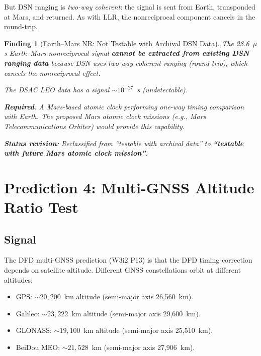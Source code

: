 \documentclass[11pt]{article}
\newtheorem{finding}{Finding}
\begin{document}
But DSN ranging is \emph{two-way coherent}: the signal is sent from
Earth, transponded at Mars, and returned. As with LLR, the nonreciprocal
component cancels in the round-trip.

\begin{finding}[Earth--Mars NR: Not Testable with Archival DSN Data]
\label{find:Mars-not-archival}
The 28.6~$\mu$s Earth--Mars nonreciprocal signal \textbf{cannot be
extracted from existing DSN ranging data} because DSN uses two-way
coherent ranging (round-trip), which cancels the nonreciprocal effect.

The DSAC LEO data has a signal $\sim 10^{-27}$~s (undetectable).

\textbf{Required}: A Mars-based atomic clock performing one-way timing
comparison with Earth. The proposed Mars atomic clock missions (e.g.,
Mars Telecommunications Orbiter) would provide this capability.

\textbf{Status revision}: Reclassified from ``testable with archival data''
to \textbf{``testable with future Mars atomic clock mission''}.
\end{finding}

\section{Prediction 4: Multi-GNSS Altitude Ratio Test}
\label{sec:archival-GNSS}

\subsection{Signal}

The DFD multi-GNSS prediction (W3i2 P13) is that the DFD timing
correction depends on satellite altitude. Different GNSS constellations
orbit at different altitudes:
\begin{itemize}[nosep]
\item GPS: $\sim 20,200$~km altitude (semi-major axis 26,560~km).
\item Galileo: $\sim 23,222$~km altitude (semi-major axis 29,600~km).
\item GLONASS: $\sim 19,100$~km altitude (semi-major axis 25,510~km).
\item BeiDou MEO: $\sim 21,528$~km (semi-major axis 27,906~km).
\end{itemize}
\end{document}
